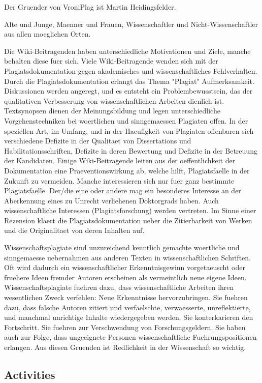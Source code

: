 Der Gruender von VroniPlag ist Martin Heidingsfelder.

Alte und Junge, Maenner und Frauen, Wissenschaftler und Nicht-Wissenschaftler aus allen moeglichen Orten. 


Die Wiki-Beitragenden haben unterschiedliche Motivationen und Ziele, manche behalten diese fuer sich. Viele Wiki-Beitragende wenden sich mit der Plagiatsdokumentation gegen akademisches und wissenschaftliches Fehlverhalten. Durch die Plagiatsdokumentation erlangt das Thema "Plagiat" Aufmerksamkeit. Diskussionen werden angeregt, und es entsteht ein Problembewusstsein, das der qualitativen Verbesserung von wissenschaftlichen Arbeiten dienlich ist. Textsynopsen dienen der Meinungsbildung und legen unterschiedliche Vorgehenstechniken bei woertlichen und sinngemaessen Plagiaten offen. In der speziellen Art, im Umfang, und in der Haeufigkeit von Plagiaten offenbaren sich verschiedene Defizite in der Qualitaet von Dissertations und Habilitationsschriften, Defizite in deren Bewertung und Defizite in der Betreuung der Kandidaten. Einige Wiki-Beitragende leiten aus der oeffentlichkeit der Dokumentation eine Praeventionswirkung ab, welche hilft, Plagiatsfaelle in der Zukunft zu vermeiden. Manche interessieren sich nur fuer ganz bestimmte Plagiatsfaelle. Der/die eine oder andere mag ein besonderes Interesse an der Aberkennung eines zu Unrecht verliehenen Doktorgrads haben. Auch wissenschaftliche Interessen (Plagiatsforschung) werden vertreten. Im Sinne einer Rezension klaert die Plagiatsdokumentation ueber die Zitierbarkeit von Werken und die Originalitaet von deren Inhalten auf. 

Wissenschaftsplagiate sind unzureichend kenntlich gemachte woertliche und sinngemaesse uebernahmen aus anderen Texten in wissenschaftlichen Schriften. Oft wird dadurch ein wissenschaftlicher Erkenntnisgewinn vorgetaeuscht oder fruehere Ideen fremder Autoren erscheinen als vermeintlich neue eigene Ideen. Wissenschaftsplagiate fuehren dazu, dass wissenschaftliche Arbeiten ihren wesentlichen Zweck verfehlen: Neue Erkenntnisse hervorzubringen. Sie fuehren dazu, dass falsche Autoren zitiert und verfaelschte, verwaesserte, unreflektierte, und manchmal unrichtige Inhalte wiedergegeben werden. Sie konterkarieren den Fortschritt. Sie fuehren zur Verschwendung von Forschungsgeldern. Sie haben auch zur Folge, dass ungeeignete Personen wissenschaftliche Fuehrungspositionen erlangen. Aus diesen Gruenden ist Redlichkeit in der Wissenschaft so wichtig. 
	\subsection{Activities}
	
